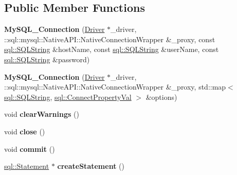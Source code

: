 \subsection*{Public Member Functions}
\begin{DoxyCompactItemize}
\item 
\hypertarget{classsql_1_1mysql_1_1_my_s_q_l___connection_a8b17e7794b1eb2199b63c47db273e130}{}\label{classsql_1_1mysql_1_1_my_s_q_l___connection_a8b17e7794b1eb2199b63c47db273e130} 
{\bfseries My\+S\+Q\+L\+\_\+\+Connection} (\hyperlink{classsql_1_1_driver}{Driver} $\ast$\+\_\+driver, \+::sql\+::mysql\+::\+Native\+A\+P\+I\+::\+Native\+Connection\+Wrapper \&\+\_\+proxy, const \hyperlink{classsql_1_1_s_q_l_string}{sql\+::\+S\+Q\+L\+String} \&host\+Name, const \hyperlink{classsql_1_1_s_q_l_string}{sql\+::\+S\+Q\+L\+String} \&user\+Name, const \hyperlink{classsql_1_1_s_q_l_string}{sql\+::\+S\+Q\+L\+String} \&password)
\item 
\hypertarget{classsql_1_1mysql_1_1_my_s_q_l___connection_a5462b93002e38f0462562eccf6a3c8c1}{}\label{classsql_1_1mysql_1_1_my_s_q_l___connection_a5462b93002e38f0462562eccf6a3c8c1} 
{\bfseries My\+S\+Q\+L\+\_\+\+Connection} (\hyperlink{classsql_1_1_driver}{Driver} $\ast$\+\_\+driver, \+::sql\+::mysql\+::\+Native\+A\+P\+I\+::\+Native\+Connection\+Wrapper \&\+\_\+proxy, std\+::map$<$ \hyperlink{classsql_1_1_s_q_l_string}{sql\+::\+S\+Q\+L\+String}, \hyperlink{classsql_1_1_variant}{sql\+::\+Connect\+Property\+Val} $>$ \&options)
\item 
\hypertarget{classsql_1_1mysql_1_1_my_s_q_l___connection_aa792ed9b722ec4b45842872865fcc1d9}{}\label{classsql_1_1mysql_1_1_my_s_q_l___connection_aa792ed9b722ec4b45842872865fcc1d9} 
void {\bfseries clear\+Warnings} ()
\item 
\hypertarget{classsql_1_1mysql_1_1_my_s_q_l___connection_aa8d0be382f89bfe031d276a2c67bb7fb}{}\label{classsql_1_1mysql_1_1_my_s_q_l___connection_aa8d0be382f89bfe031d276a2c67bb7fb} 
void {\bfseries close} ()
\item 
\hypertarget{classsql_1_1mysql_1_1_my_s_q_l___connection_aca3dab58cd10c2bd877fadc2fa7b9b3f}{}\label{classsql_1_1mysql_1_1_my_s_q_l___connection_aca3dab58cd10c2bd877fadc2fa7b9b3f} 
void {\bfseries commit} ()
\item 
\hypertarget{classsql_1_1mysql_1_1_my_s_q_l___connection_a65dd9ce62b91f6ee7422bf6acaa6dc59}{}\label{classsql_1_1mysql_1_1_my_s_q_l___connection_a65dd9ce62b91f6ee7422bf6acaa6dc59} 
\hyperlink{classsql_1_1_statement}{sql\+::\+Statement} $\ast$ {\bfseries create\+Statement} ()
\item 

\end{DoxyCompactItemize}

